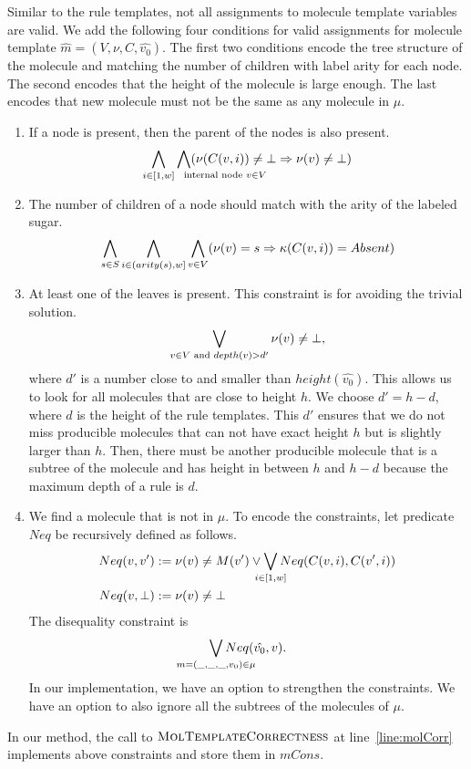 %
Similar to the rule templates, not all assignments to molecule template variables
are valid.
We add the following four conditions for
valid assignments for molecule template $\hat{m} = (V, \nu, C, \hat{v_0})$.
The first  two conditions encode the tree structure of the molecule and
matching the number of children with label arity for each node.
The second encodes that the height of the molecule is large enough.
The last encodes that new molecule must not be the same as any molecule in $\mu$.
\begin{enumerate}
\item If a node is present, then the parent of the nodes is also present.
  $$
  \Land_{i\in[1,w]}\Land_{\mathrlap{\text{internal node } v \in V}} (\nu(C(v,i) ) \neq \bot \limplies \nu( v ) \neq \bot )  
  $$
\item The number of children of a node should match with the arity of the labeled sugar.
  $$
  \bigwedge_{s \in S} \bigwedge_{i \in (arity(s),w] }\bigwedge_{v \in V} (\nu(v) = s \Rightarrow \kappa( C(v,i) ) = Absent )
  $$
\item At least one of the leaves is present. This constraint is for
  avoiding the trivial solution.
  $$
  \bigvee_{ v \in V \text{ and } depth(v) > d' } \nu( v ) \neq \bot,
  $$
  where $d'$ is a number close to and smaller than $height(\hat{v_0})$.
  This allows us to look for all molecules that are close
  to height $h$.
  We choose $d' = h-d$, where $d$ is the height of the rule templates.
  This $d'$ ensures that we do not miss producible molecules that
  can not have exact height $h$ but is slightly larger than $h$.
  Then, there must be another producible
  molecule that is a subtree of the molecule and has height in
  between $h$ and $h-d$
  because the maximum depth of a rule is $d$.
\item We find a molecule that is not in $\mu$.
  To encode the constraints, let predicate $Neq$ be recursively defined as follows.
  \begin{align*}
  Neq(v, v') :=\;&   \nu(v) \neq M(v') \lor
  \Lor_{\mathclap{i \in [1,w]}} Neq( C(v,i), C(v',i ) )\\
    Neq(v,\bot) :=\;&  \nu(v) \neq \bot
  \end{align*}
  The disequality constraint is
  \begin{align*}
    \Lor_{\mathclap{m = (\_,\_,\_, v_0)\in \mu}}  Neq(\hat{v_0},v).
  \end{align*}
  In our implementation, we have an option to strengthen
  the constraints.
  We have an option to also ignore all the subtrees of
  the molecules of $\mu$.
\end{enumerate}
%
In our method, the call to $\textsc{MolTemplateCorrectness}$ at
line~\ref{line:molCorr} implements above constraints and store them in
$mCons$. 

